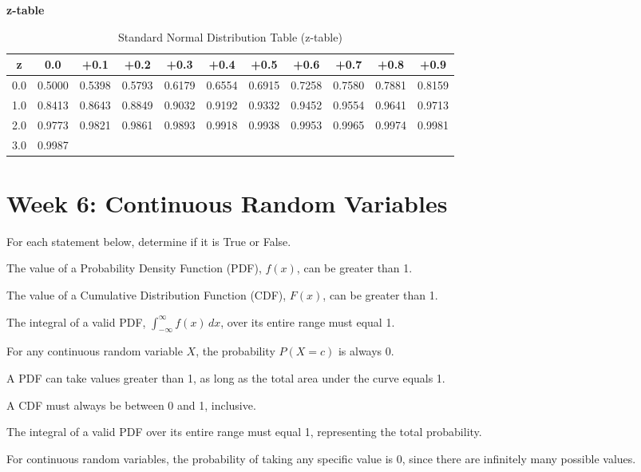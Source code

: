 \documentclass[a4paper, 10pt]{article}
\newcommand{\zScoreTable}[1]{
    \par\noindent \textbf{z-table}
    \begin{table}[h]
        \centering
        \renewcommand{\arraystretch}{#1}
        \begin{tabular}{|c|cccccccccc|}
            \hline
            \textbf{z} & 0.0 & +0.1 & +0.2 & +0.3 & +0.4 & +0.5 & +0.6 & +0.7 & +0.8 & +0.9 \\
            \hline
            0.0 & 0.5000 & 0.5398 & 0.5793 & 0.6179 & 0.6554 & 0.6915 & 0.7258 & 0.7580 & 0.7881 & 0.8159 \\
            1.0 & 0.8413 & 0.8643 & 0.8849 & 0.9032 & 0.9192 & 0.9332 & 0.9452 & 0.9554 & 0.9641 & 0.9713 \\
            2.0 & 0.9773 & 0.9821 & 0.9861 & 0.9893 & 0.9918 & 0.9938 & 0.9953 & 0.9965 & 0.9974 & 0.9981 \\
            3.0 & 0.9987 & & & & & & & & & \\
            \hline
        \end{tabular}
        \caption{Standard Normal Distribution Table (z-table)}
        \label{tab:z-table}
    \end{table}
}
\begin{document}
\subject[2110205 - Statistics for Computer Engineering]

\zScoreTable{1.2}

\section{Week 6: Continuous Random Variables}



\begin{problem}
For each statement below, determine if it is True or False.
\begin{subproblems}
    \item The value of a Probability Density Function (PDF), \( f(x) \), can be greater than 1.
    \item The value of a Cumulative Distribution Function (CDF), \( F(x) \), can be greater than 1.
    \item The integral of a valid PDF, \( \int_{-\infty}^{\infty} f(x)\,dx \), over its entire range must equal 1.
    \item For any continuous random variable \( X \), the probability \( P(X = c) \) is always 0.
\end{subproblems}
\end{problem}

\begin{solution}
\begin{subproblems}
    \item {} A PDF can take values greater than 1, as long as the total area under the curve equals 1.
    \item {} A CDF must always be between 0 and 1, inclusive.
    \item {} The integral of a valid PDF over its entire range must equal 1, representing the total probability.
    \item {} For continuous random variables, the probability of taking any specific value is 0, since there are infinitely many possible values.
\end{subproblems}
\end{solution}
\end{document}

